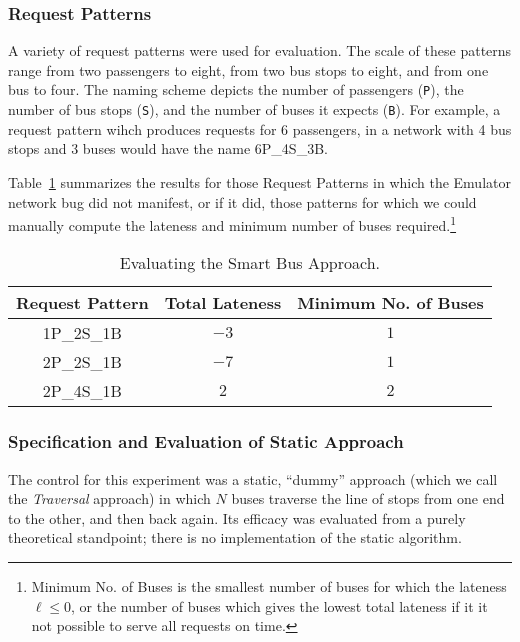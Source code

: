 \documentclass[runningheads]{llncs}
\begin{document}
\subsubsection{Request Patterns}
A variety of request patterns were used for evaluation. The scale of these patterns range from two passengers to eight, from two bus stops to eight, and from one bus to four. The naming scheme depicts the number of passengers (\lstinline{P}), the number of bus stops (\lstinline{S}), and the number of buses it expects (\lstinline{B}). For example, a request pattern wihch produces requests for 6 passengers, in a network with 4 bus stops and 3 buses would have the name 6P\_4S\_3B.

Table~\ref{tbl:smart-bus} summarizes the results for those Request Patterns in which the Emulator network bug did not manifest, or if it did, those patterns for which we could manually compute the lateness and minimum number of buses required.\footnote{Minimum No. of Buses is the smallest number of buses for which the lateness $\ell \leq 0$, or the number of buses which gives the lowest total lateness if it it not possible to serve all requests on time.}

\setlength{\tabcolsep}{1em}
\begin{table}[htbp]
\centering
\caption{Evaluating the Smart Bus Approach.}
\begin{tabular}{c c c}
Request Pattern & Total Lateness & Minimum No. of Buses \\ \hline
1P\_2S\_1B & $-3$ & $1$ \\
2P\_2S\_1B & $-7$ & $1$ \\
2P\_4S\_1B & $2$  & $2$ \\
\end{tabular}
\label{tbl:smart-bus}
\end{table}

\subsubsection{Specification and Evaluation of Static Approach}
The control for this experiment was a static, ``dummy'' approach (which we call the \emph{Traversal} approach) in which $N$ buses traverse the line of stops from one end to the other, and then back again. Its efficacy was evaluated from a purely theoretical standpoint; there is no implementation of the static algorithm.
\end{document}
